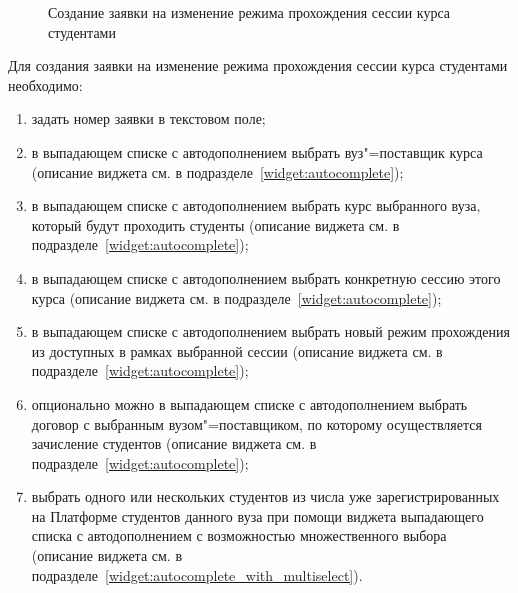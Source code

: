 \begin{figure}[H]
	\caption{Создание заявки на изменение режима прохождения сессии курса студентами}
	\label{img:student:change_mode_req_create}
\end{figure}

Для создания заявки на изменение режима прохождения сессии курса студентами необходимо:
\begin{enumerate}
	\item задать номер заявки в текстовом поле;
	\item в выпадающем списке с автодополнением выбрать вуз"=поставщик курса
	(описание виджета см. в подразделе~\ref{widget:autocomplete});
	\item в выпадающем списке с автодополнением выбрать курс выбранного вуза, который будут проходить студенты 
	(описание виджета см. в подразделе~\ref{widget:autocomplete});
	\item в выпадающем списке с автодополнением выбрать конкретную сессию этого курса 
	(описание виджета см. в подразделе~\ref{widget:autocomplete});
	\item в выпадающем списке с автодополнением выбрать новый режим прохождения из доступных в рамках выбранной сессии 
	(описание виджета см. в подразделе~\ref{widget:autocomplete});
	\item опционально можно в выпадающем списке с автодополнением выбрать договор с выбранным вузом"=поставщиком, 
	по которому осуществляется зачисление студентов (описание виджета см. в подразделе~\ref{widget:autocomplete});
	\item выбрать одного или нескольких студентов из числа уже зарегистрированных на Платформе студентов данного вуза 
	при помощи виджета выпадающего списка с автодополнением с возможностью множественного выбора 
	(описание виджета см. в подразделе~\ref{widget:autocomplete_with_multiselect}). 
\end{enumerate}


